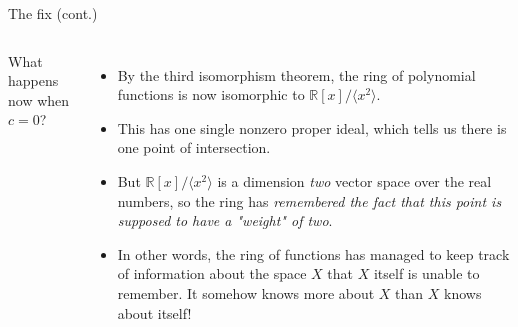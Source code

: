 \documentclass[aspectratio=169,10pt]{beamer}
\begin{document}
\begin{frame}{The fix (cont.)}
\begin{columns}[T]
    What happens now when $c=0$?
    \begin{itemize}
        \item By the third isomorphism theorem, the ring of polynomial functions is now isomorphic to $\mathbb{R}[x]/\langle x^2\rangle$.
        \pause\item This has one single nonzero proper ideal, which tells us there is one point of intersection.
        \pause\item But $\mathbb{R}[x]/\langle x^2\rangle$ is a dimension \textit{two} vector space over the real numbers, so the ring has \textit{remembered the fact that this point is supposed to have a "weight" of two}.
        \pause\item In other words, the ring of functions has managed to keep track of information about the space $X$ that $X$ itself is unable to remember. It somehow knows more about $X$ than $X$ knows about itself!
    \end{itemize}

      \centering
\end{columns}
\end{frame}
\end{document}
